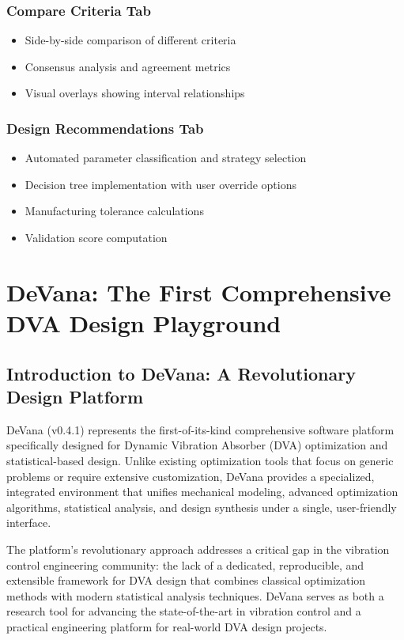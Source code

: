 \documentclass[12pt,a4paper]{article}
\newcommand{\softwareName}{DeVana}
\newcommand{\softwareVersion}{v0.4.1}
\begin{document}
\subsubsection{Compare Criteria Tab}
\begin{itemize}
    \item Side-by-side comparison of different criteria
    \item Consensus analysis and agreement metrics
    \item Visual overlays showing interval relationships
\end{itemize}

\subsubsection{Design Recommendations Tab}
\begin{itemize}
    \item Automated parameter classification and strategy selection
    \item Decision tree implementation with user override options
    \item Manufacturing tolerance calculations
    \item Validation score computation
\end{itemize}

\section{DeVana: The First Comprehensive DVA Design Playground}
\label{sec:devana-software}

\subsection{Introduction to DeVana: A Revolutionary Design Platform}

\softwareName{} (\softwareVersion{}) represents the first-of-its-kind comprehensive software platform specifically designed for Dynamic Vibration Absorber (DVA) optimization and statistical-based design. Unlike existing optimization tools that focus on generic problems or require extensive customization, \softwareName{} provides a specialized, integrated environment that unifies mechanical modeling, advanced optimization algorithms, statistical analysis, and design synthesis under a single, user-friendly interface.

The platform's revolutionary approach addresses a critical gap in the vibration control engineering community: the lack of a dedicated, reproducible, and extensible framework for DVA design that combines classical optimization methods with modern statistical analysis techniques. \softwareName{} serves as both a research tool for advancing the state-of-the-art in vibration control and a practical engineering platform for real-world DVA design projects.
\end{document}
